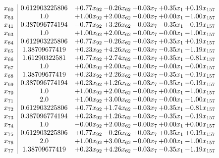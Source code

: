\documentclass[8pt]{article}
\begin{document}
\[\begin{array}{c| c c@{\hskip 2pt} c@{\hskip 2pt} c@{\hskip 2pt} c@{\hskip 2pt} c@{\hskip 2pt} }
 x_{60}   &  0.612903225806 & +  0.77 x_{92} & -0.26 x_{62} & +  0.03 x_{7} & +  0.35 x_{1} & +  0.19 x_{157}\\
 x_{53}   &  1.0 & +  1.00 x_{92} & +  2.00 x_{62} & -0.00 x_{7} & +  0.00 x_{1} & -1.00 x_{157}\\
 x_{41}   &  0.387096774194 & -0.77 x_{92} & +  3.26 x_{62} & -0.03 x_{7} & -0.35 x_{1} & -0.19 x_{157}\\
 x_{63}   &  1.0 & +  1.00 x_{92} & +  2.00 x_{62} & -0.00 x_{7} & -0.00 x_{1} & -1.00 x_{157}\\
 x_{64}   &  0.612903225806 & +  0.77 x_{92} & -0.26 x_{62} & +  0.03 x_{7} & +  0.35 x_{1} & +  0.19 x_{157}\\
 x_{65}   &  1.38709677419 & +  0.23 x_{92} & +  4.26 x_{62} & -0.03 x_{7} & -0.35 x_{1} & -1.19 x_{157}\\
 x_{66}   &  1.61290322581 & +  0.77 x_{92} & +  2.74 x_{62} & +  0.03 x_{7} & +  0.35 x_{1} & -0.81 x_{157}\\
 x_{67}   &  1.0 & +  0.00 x_{92} & +  2.00 x_{62} & -0.00 x_{7} & -0.00 x_{1} & -0.00 x_{157}\\
 x_{68}   &  1.38709677419 & +  0.23 x_{92} & +  2.26 x_{62} & -0.03 x_{7} & -0.35 x_{1} & -0.19 x_{157}\\
 x_{69}   &  0.387096774194 & +  0.23 x_{92} & +  1.26 x_{62} & -0.03 x_{7} & -0.35 x_{1} & -0.19 x_{157}\\
 x_{70}   &  1.0 & +  1.00 x_{92} & +  2.00 x_{62} & -0.00 x_{7} & +  0.00 x_{1} & -1.00 x_{157}\\
 x_{71}   &  2.0 & +  1.00 x_{92} & +  3.00 x_{62} & -0.00 x_{7} & -0.00 x_{1} & -1.00 x_{157}\\
 x_{72}   &  0.612903225806 & +  0.77 x_{92} & +  1.74 x_{62} & +  0.03 x_{7} & +  0.35 x_{1} & -0.81 x_{157}\\
 x_{73}   &  0.387096774194 & +  0.23 x_{92} & +  1.26 x_{62} & -0.03 x_{7} & -0.35 x_{1} & -0.19 x_{157}\\
 x_{74}   &  1.0 & -0.00 x_{92} & +  2.00 x_{62} & -0.00 x_{7} & +  0.00 x_{1} & +  0.00 x_{157}\\
 x_{75}   &  0.612903225806 & +  0.77 x_{92} & -0.26 x_{62} & +  0.03 x_{7} & +  0.35 x_{1} & +  0.19 x_{157}\\
 x_{76}   &  2.0 & +  1.00 x_{92} & +  3.00 x_{62} & -0.00 x_{7} & +  0.00 x_{1} & -1.00 x_{157}\\
 x_{77}   &  1.38709677419 & +  0.23 x_{92} & +  4.26 x_{62} & -0.03 x_{7} & -0.35 x_{1} & -1.19 x_{157}\\

\end{array}\]
\end{document}
